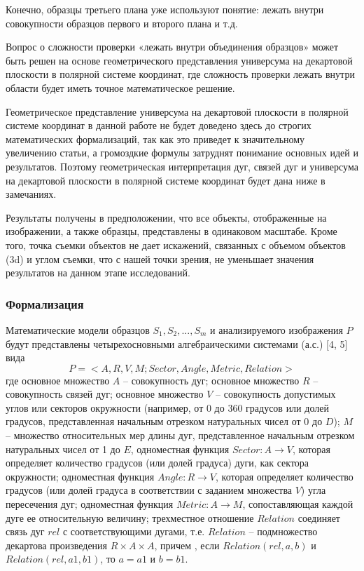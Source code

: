 Конечно,  образцы третьего плана уже используют понятие: лежать внутри  совокупности образцов первого и второго плана и т.д.

Вопрос о сложности проверки «лежать внутри объединения образцов» может быть решен на основе геометрического представления универсума на декартовой плоскости в полярной системе координат, где сложность проверки лежать внутри области будет иметь точное математическое решение.

Геометрическое представление универсума на декартовой плоскости в полярной системе координат в данной работе не будет доведено здесь до строгих математических формализаций, так как это приведет к значительному увеличению статьи, а громоздкие формулы затруднят понимание основных идей и результатов. Поэтому геометрическая интерпретация дуг, связей дуг и универсума на декартовой плоскости в полярной системе координат будет дана ниже в замечаниях.

Результаты получены в предположении, что все объекты, отображенные  на изображении, а также образцы, представлены в одинаковом масштабе. Кроме того, точка съемки объектов не дает искажений, связанных с объемом объектов (3d) и углом съемки, что с нашей точки зрения, не уменьшает значения результатов на данном этапе исследований.

\subsubsection{Формализация}

Математические модели образцов $S_1, S_2, ..., S_m$  и анализируемого изображения $P$ будут представлены четырехосновными алгебраическими системами (а.с.) [4, 5] вида
\begin{equation}
P = < A, R, V, M; Sector,  Angle, Metric, Relation >
\label{overlaps:1}
\end{equation}
где  основное множество $A$ -- совокупность дуг; основное множество $R$ -- совокупность связей дуг; основное множество $V$ -- совокупность допустимых углов или  секторов окружности  (например, от 0 до 360 градусов или долей градусов, представленная  начальным  отрезком  натуральных чисел от 0 до $D$); $M$ -- множество относительных мер длины дуг, представленное  начальным отрезком натуральных чисел от 1 до $E$, одноместная функция $Sector: A \to V$, которая определяет количество градусов (или долей градуса) дуги,  как сектора окружности; одноместная функция  $Angle: R \to V$, которая  определяет количество градусов (или  долей градуса в соответствии с заданием множества $V$) угла пересечения дуг; одноместная функция  $Metric : A \to M$, сопоставляющая каждой дуге ее относительную величину; трехместное отношение $Relation$ соединяет связь дуг $rel$ с соответствующими дугами, т.е. $Relation$ -- подмножество декартова произведения  $R \times A \times A$, причем , если $Relation(rel , a, b)$  и $Relation(rel , a1, b1)$,  то $a = a1$  и  $b = b1$.

